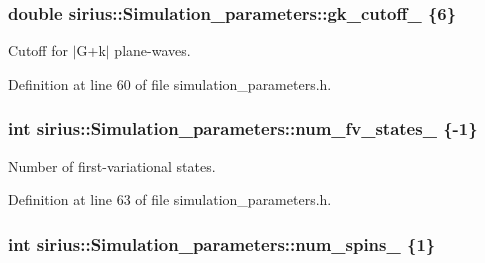 \subsubsection[{gk\+\_\+cutoff\+\_\+}]{\setlength{\rightskip}{0pt plus 5cm}double sirius\+::\+Simulation\+\_\+parameters\+::gk\+\_\+cutoff\+\_\+ \{6\}\hspace{0.3cm}{\ttfamily [protected]}}\label{classsirius_1_1_simulation__parameters_a219a43b81780aa1c53b037b748970de8}


Cutoff for $\vert$\+G+k$\vert$ plane-\/waves. 



Definition at line 60 of file simulation\+\_\+parameters.\+h.

\hypertarget{classsirius_1_1_simulation__parameters_ae0ad7dd838b9147f2702229b3a15400b}{}
\subsubsection[{num\+\_\+fv\+\_\+states\+\_\+}]{\setlength{\rightskip}{0pt plus 5cm}int sirius\+::\+Simulation\+\_\+parameters\+::num\+\_\+fv\+\_\+states\+\_\+ \{-\/1\}\hspace{0.3cm}{\ttfamily [protected]}}\label{classsirius_1_1_simulation__parameters_ae0ad7dd838b9147f2702229b3a15400b}


Number of first-\/variational states. 



Definition at line 63 of file simulation\+\_\+parameters.\+h.

\hypertarget{classsirius_1_1_simulation__parameters_a2942cc87ed44e4e2e36a3daee27791a9}{}
\subsubsection[{num\+\_\+spins\+\_\+}]{\setlength{\rightskip}{0pt plus 5cm}int sirius\+::\+Simulation\+\_\+parameters\+::num\+\_\+spins\+\_\+ \{1\}\hspace{0.3cm}{\ttfamily [protected]}}\label{classsirius_1_1_simulation__parameters_a2942cc87ed44e4e2e36a3daee27791a9}


